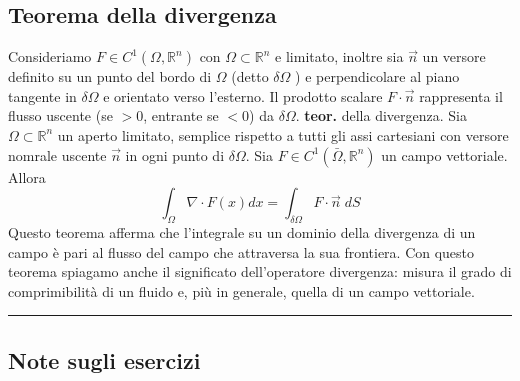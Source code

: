 \subsection*{Teorema della divergenza}
Consideriamo $F \in C^1(\Omega, \mathbb{R}^n)$ con $\Omega \subset \mathbb{R}^n$ e limitato, inoltre sia $\vec{n}$ un versore definito su un punto del bordo di $\Omega$ (detto $\delta\Omega$ ) e perpendicolare al piano tangente in $\delta \Omega$ e orientato verso l'esterno.\newline
Il prodotto scalare $F \cdot \vec{n}$ rappresenta il flusso uscente (se $> 0$, entrante se $<0$)  da $\delta\Omega$.\newline
\newline
\textbf{teor.} della divergenza.\newline
Sia $\Omega \subset \mathbb{R}^n$ un aperto limitato, semplice rispetto a tutti gli assi cartesiani con versore nomrale uscente $\vec{n}$ in ogni punto di $\delta\Omega$. Sia $F \in C^1(\bar{\Omega}, \mathbb{R}^n)$ un campo vettoriale. Allora
\[
    \int_\Omega \nabla \cdot  F(x) dx = \int_{\delta\Omega} F \cdot  \vec{n} \; dS
\]
Questo teorema afferma che l'integrale su un dominio della divergenza di un campo è pari al flusso del campo che attraversa la sua frontiera.\newline
Con questo teorema spiagamo anche il significato dell'operatore divergenza: misura il grado di comprimibilità di un fluido e, più in generale, quella di un campo vettoriale.\newline
\rule{\textwidth}{2pt}
\subsection*{Note sugli esercizi}